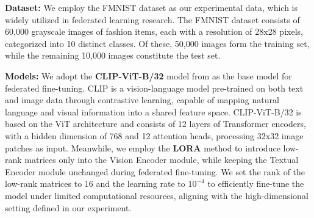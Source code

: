 \documentclass[lettersize,journal]{IEEEtran}
\begin{document}


\textbf{Dataset:} We employ the FMNIST dataset \cite{minist} as our experimental data, which is widely utilized in federated learning research. The FMNIST dataset consists of 60,000 grayscale images of fashion items, each with a resolution of 28x28 pixels, categorized into 10 distinct classes. Of these, 50,000 images form the training set, while the remaining 10,000 images constitute the test set.





\textbf{Models:} 
We adopt the \textbf{CLIP-ViT-B/32}\cite{huggingface_clip} model from \cite{clip} as the base model for federated fine-tuning. CLIP is a vision-language model pre-trained on both text and image data through contrastive learning, capable of mapping natural language and visual information into a shared feature space. CLIP-ViT-B/32 is based on the ViT\cite{vit} architecture and consists of 12 layers of Transformer encoders, with a hidden dimension of 768 and 12 attention heads, processing 32x32 image patches as input. Meanwhile, we employ the \textbf{LORA}\cite{lora} method to introduce low-rank matrices only into the Vision Encoder module, while keeping the Textual Encoder module unchanged during federated fine-tuning. We set the rank of the low-rank matrices to 16 and the learning rate to \textbf{$10^{-4}$} to efficiently fine-tune the model under limited computational resources, aligning with the high-dimensional setting defined in our experiment.
\end{document}
